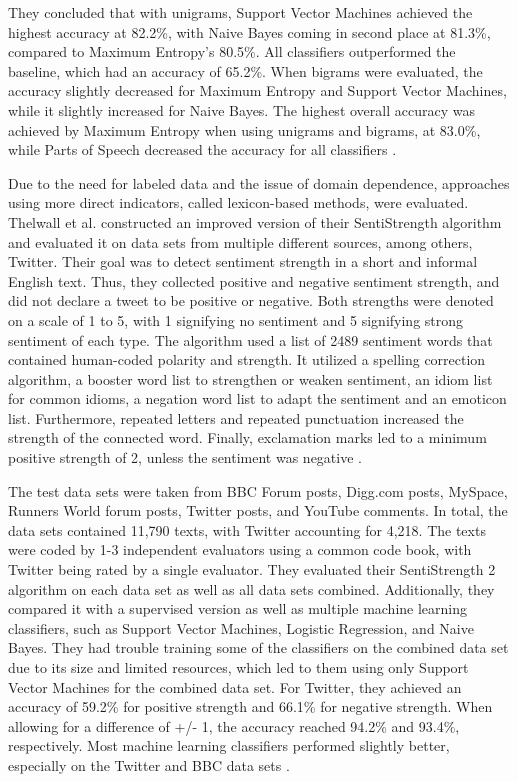 They concluded that with unigrams, Support Vector Machines achieved the highest accuracy at 82.2\%, with Naive Bayes coming in second place at 81.3\%, compared to Maximum Entropy's 80.5\%. All classifiers outperformed the baseline, which had an accuracy of 65.2\%. When bigrams were evaluated, the accuracy slightly decreased for Maximum Entropy and Support Vector Machines, while it slightly increased for Naive Bayes. The highest overall accuracy was achieved by Maximum Entropy when using unigrams and bigrams, at 83.0\%, while Parts of Speech decreased the accuracy for all classifiers \cite{GoBHaHua2009}. 

Due to the need for labeled data and the issue of domain dependence, approaches using more direct indicators, called lexicon-based methods, were evaluated. Thelwall et al. constructed an improved version of their SentiStrength algorithm and evaluated it on data sets from multiple different sources, among others, Twitter. Their goal was to detect sentiment strength in a short and informal English text. Thus, they collected positive and negative sentiment strength, and did not declare a tweet to be positive or negative. Both strengths were denoted on a scale of 1 to 5, with 1 signifying no sentiment and 5 signifying strong sentiment of each type. The algorithm used a list of 2489 sentiment words that contained human-coded polarity and strength. It utilized a spelling correction algorithm, a booster word list to strengthen or weaken sentiment, an idiom list for common idioms, a negation word list to adapt the sentiment and an emoticon list. Furthermore, repeated letters and repeated punctuation increased the strength of the connected word. Finally, exclamation marks led to a minimum positive strength of 2, unless the sentiment was negative \cite{10.1002/asi.21662}.

The test data sets were taken from BBC Forum posts, Digg.com posts, MySpace, Runners World forum posts, Twitter posts, and YouTube comments. In total, the data sets contained 11,790 texts, with Twitter accounting for 4,218. The texts were coded by 1-3 independent evaluators using a common code book, with Twitter being rated by a single evaluator. They evaluated their SentiStrength 2 algorithm on each data set as well as all data sets combined. Additionally, they compared it with a supervised version as well as multiple machine learning classifiers, such as Support Vector Machines, Logistic Regression, and Naive Bayes. They had trouble training some of the classifiers on the combined data set due to its size and limited resources, which led to them using only Support Vector Machines for the combined data set. For Twitter, they achieved an accuracy of 59.2\% for positive strength and 66.1\% for negative strength. When allowing for a difference of +/- 1, the accuracy reached 94.2\% and 93.4\%, respectively. Most machine learning classifiers performed slightly better, especially on the Twitter and BBC data sets \cite{10.1002/asi.21662}.

